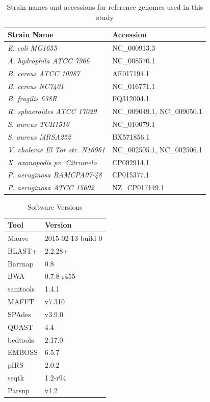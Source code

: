 \documentclass[10pt]{article}
\begin{document}
\begin{table}[]
\centering
\caption{Strain names and accessions for reference genomes used in this study}
\label{table:strainlist}
\begin{tabular}{ll}
  \toprule
  Strain Name & Accession \\
  \midrule
  \textit{E. coli MG1655} & NC\_000913.3 \\
  \textit{A. hydrophila ATCC 7966} & NC\_008570.1 \\
  \textit{B. cereus ATCC 10987} & AE017194.1 \\
  \textit{B. cereus NC7401} & NC\_016771.1 \\
  \textit{B. fragilis 638R} & FQ312004.1 \\
  \textit{R. sphaeroides ATCC 17029} & NC\_009049.1, NC\_009050.1 \\
  \textit{S. aureus TCH1516} & NC\_010079.1 \\
  \textit{S. aureus MRSA252} & BX571856.1 \\
  \textit{V. cholerae El Tor str. N16961} & NC\_002505.1, NC\_002506.1 \\
  \textit{X. axonopodis pv. Citrumelo} & CP002914.1 \\
  \textit{P. aeruginosa BAMCPA07-48} & CP015377.1 \\
  \textit{P. aeruginosa ATCC 15692} & NZ\_CP017149.1\\
  \bottomrule

\end{tabular}
\end{table}

\begin{table}[]
  \centering
  \caption{Software Versions}
  \label{table:software}
  \begin{tabular}{ll}
    \toprule
    Tool & Version \\
    \midrule
    Mauve & 2015-02-13 build 0 \\
    BLAST+ & 2.2.28+ \\
    Barrnap & 0.8 \\
    BWA & 0.7.8-r455 \\
    samtools & 1.4.1 \\
    MAFFT & v7.310 \\
    SPAdes & v3.9.0 \\
    QUAST & 4.4 \\
    bedtools & 2.17.0 \\
    EMBOSS & 6.5.7 \\
    pIRS & 2.0.2\\
    seqtk & 1.2-r94\\
    Parsnp & v1.2 \\
    \bottomrule
  \end{tabular}
\end{table}
\end{document}
